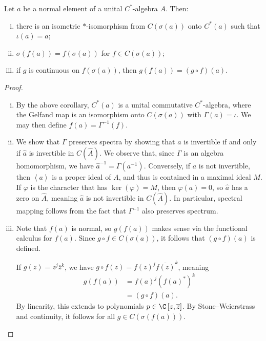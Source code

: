 \documentclass[10pt]{mypackage}
\begin{document}
\begin{theorem}
  Let $a$ be a normal element of a unital $C^{\ast}$-algebra $A$. Then:
  \begin{enumerate}[(i)]
    \item there is an isometric $\ast$-isomorphism from $C(\sigma(a))$ onto $C^{\ast}(a)$ such that $\iota  (a) = a$;
    \item $\sigma(f(a)) = f(\sigma(a))$ for $f\in C(\sigma(a))$;
    \item if $g$ is continuous on $f(\sigma(a))$, then $g(f(a)) = (g\circ f)(a)$.
  \end{enumerate}
\end{theorem}
\begin{proof}\hfill
  \begin{enumerate}[(i)]
    \item By the above corollary, $C^{\ast}(a)$ is a unital commutative $C^{\ast}$-algebra, where the Gelfand map is an isomorphism onto $C(\sigma(a))$ with $\Gamma(a) = \iota$. We may then define $f(a) = \Gamma^{-1}(f)$.
    \item We show that $\Gamma$ preserves spectra by showing that $a$ is invertible if and only if $\hat{a}$ is invertible in $C(\hat{A})$. We observe that, since $\Gamma$ is an algebra homomorphism, we have $\hat{a}^{-1} = \Gamma\left( a^{-1} \right)$. Conversely, if $a$ is not invertible, then $\left\langle a \right\rangle$ is a proper ideal of $A$, and thus is contained in a maximal ideal $M$. If $\varphi$ is the character that has $\ker\left( \varphi \right) = M$, then $\varphi(a) = 0$, so $\hat{a}$ has a zero on $\hat{A}$, meaning $\hat{a}$ is not invertible in $C(\hat{A})$. In particular, spectral mapping follows from the fact that $\Gamma^{-1}$ also preserves spectrum.
    \item Note that $f(a)$ is normal, so $g(f(a))$ makes sense via the functional calculus for $f(a)$. Since $g\circ f\in C(\sigma(a))$, it follows that $(g\circ f)(a)$ is defined.

      If $g(z) = z^j \overline{z}^{k}$, we have $g\circ f(z) = f(z)^j \overline{f(z)}^k$, meaning
      \begin{align*}
        g(f(a)) &= f(a)^j \left( f(a)^{\ast} \right)^k\\
                &= (g\circ f)(a).
      \end{align*}
      By linearity, this extends to polynomials $p\in \C\left[ z, \overline{z} \right]$. By Stone--Weierstrass and continuity, it follows for all $g\in C(\sigma(f(a)))$.
  \end{enumerate}
\end{proof}
\end{document}

